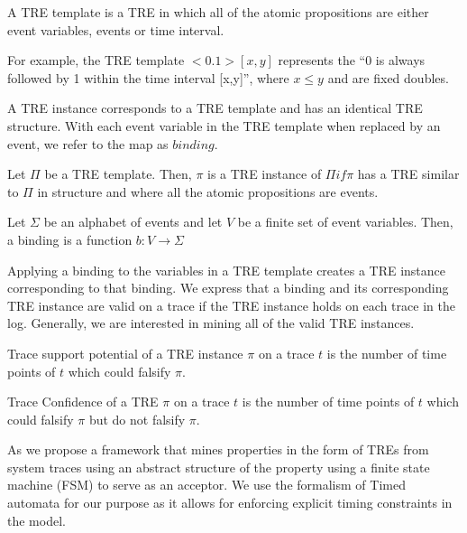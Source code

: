 \documentclass[]{sigplanconf}
\begin{document}
\begin{defns} A TRE template is a TRE in which all of the atomic propositions are either event variables, events or time interval.
\end{defns}
For example, the TRE template $<0.1>[x,y]$ represents the ``0 is always followed by 1 within the time interval [x,y]'', where $x \le y$ and are fixed doubles.

A TRE instance corresponds to a TRE template and has an identical TRE structure. With each event variable in the TRE template when replaced by an event, we refer to the map as $binding$.

\begin{defns}
Let $\Pi$ be a TRE template. Then, $\pi$ is a TRE instance of $\Pi if \pi$ has a TRE similar to $\Pi$ in structure and where all the atomic propositions are events.
\end{defns}

\begin{defns}[Binding]
Let $\Sigma$ be an alphabet of events and let $V$ be a finite set of event variables. Then, a binding is a function $b \colon V \rightarrow \Sigma$
\end{defns}

Applying a binding to the variables in a TRE template creates a TRE instance corresponding to that binding. We express that a binding and its corresponding TRE instance are valid on a trace if the TRE instance holds on each trace in the log. Generally, we are interested in mining all of the valid TRE instances.

\begin{defns}
Trace support potential of a TRE instance $\pi$ on a trace $t$ is the number of time points of $t$ which could falsify $\pi$.
\end{defns}

\begin{defns}
Trace Confidence of a TRE $\pi$ on a trace $t$ is the number of time points of $t$ which could falsify $\pi$ but do not falsify $\pi$.
\end{defns}

As we propose a framework that mines properties in the form of TREs from system traces using an abstract structure of the property using a finite state machine (FSM) to serve as an acceptor. We use the formalism of Timed automata for our purpose as it allows for enforcing explicit timing constraints in the model.
\end{document}
